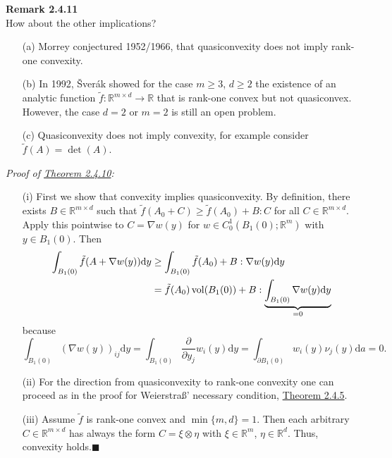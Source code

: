 \textbf{Remark 2.4.11}\\
How about the other implications?
\begin{itemize}
	\item[(a)] Morrey conjectured 1952/1966, that quasiconvexity does not imply rank-one convexity.
	\item[(b)] In 1992, \v{S}ver\'ak showed for the case $m\geq3$, $d\geq2$ the existence of an analytic function $\tilde{f}:\mathbb{R}^{m\times d}\longrightarrow\mathbb{R}$ that is rank-one convex but not quasiconvex. However, the case $d=2$ or $m=2$ is still an open problem.
	\item[(c)] Quasiconvexity does not imply convexity, for example consider $\tilde{f}(A)=\det(A)$.\\
\end{itemize}

\textit{Proof of \hyperlink{theorem_2_4_10}{Theorem 2.4.10}:}
\begin{itemize}
	\item[(i)] First we show that convexity implies quasiconvexity. By definition, there exists $B\in\mathbb{R}^{m\times d}$ such that $\tilde{f}(A_0+C)\geq\tilde{f}(A_0)+B:C$ for all $C\in\mathbb{R}^{m\times d}$. Apply this pointwise to $C=\nabla w(y)$ for $w\in C_0^1(B_1(0);\mathbb{R}^m)$ with $y\in B_1(0)$. Then
	\begin{align*}
		\int_{B_1(0)}{\tilde{f}(A+\nabla w(y))\mathrm{d}y}&\geq\int_{B_1(0)}{\tilde{f}(A_0)+B:\nabla w(y)\mathrm{d}y}\\
		&=\tilde{f}(A_0)\operatorname{vol}\mathopen{}\left(B_1(0)\right)\mathclose{}+B:\underbrace{\int_{B_1(0)}{\nabla w(y)\mathrm{d}y}}_{=0}
	\end{align*}
	because
	\[\int_{B_1(0)}{(\nabla w(y))_{ij}\mathrm{d}y}=\int_{B_1(0)}{\frac{\partial}{\partial y_j}w_i(y)\mathrm{d}y}=\int_{\partial B_1(0)}{w_i(y)\nu_j(y)\mathrm{d}a}=0.\]
	\item[(ii)] For the direction from quasiconvexity to rank-one convexity one can proceed as in the proof for Weierstra{\ss}' necessary condition, \hyperlink{theorem_2_4_5}{Theorem 2.4.5}.
	\item[(iii)] Assume $\tilde{f}$ is rank-one convex and $\min\{m,d\}=1$. Then each arbitrary $C\in\mathbb{R}^{m\times d}$ has always the form $C=\xi\otimes\eta$ with $\xi\in\mathbb{R}^m$, $\eta\in\mathbb{R}^d$. Thus, convexity holds.\hfill$\blacksquare$
\end{itemize}